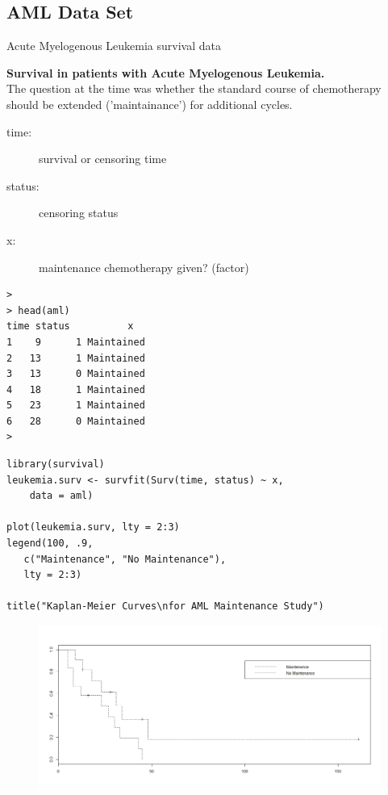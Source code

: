 \documentclass[SurvivalMain.tex]{subfiles}
\begin{document}
\Large	
\subsection{AML Data Set}

Acute Myelogenous Leukemia survival data


\noindent \textbf{Survival in patients with Acute Myelogenous Leukemia. }\\
The question at the time was whether the standard course of chemotherapy should be extended ('maintainance') for additional cycles.

\begin{description}
\item[time:]	survival or censoring time
\item[status:]	censoring status
\item[x:]	maintenance chemotherapy given? (factor)
\end{description}
\begin{verbatim}
> 
> head(aml)
time status          x
1    9      1 Maintained
2   13      1 Maintained
3   13      0 Maintained
4   18      1 Maintained
5   23      1 Maintained
6   28      0 Maintained
> 
\end{verbatim}
{
	\large
\begin{framed}
\begin{verbatim}
library(survival)
leukemia.surv <- survfit(Surv(time, status) ~ x, 
    data = aml) 

plot(leukemia.surv, lty = 2:3) 
legend(100, .9, 
   c("Maintenance", "No Maintenance"), 
   lty = 2:3) 

title("Kaplan-Meier Curves\nfor AML Maintenance Study") 
\end{verbatim}
\end{framed}
}
\begin{figure}[h!]
\centering
\includegraphics[width=0.7\linewidth]{AML1}
\caption{}
\label{fig:AML1}
\end{figure}
\end{document}
